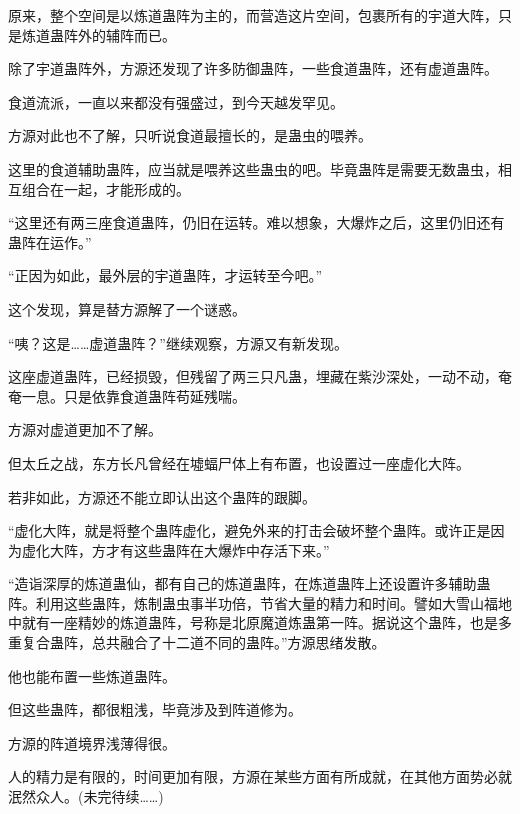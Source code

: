 \begin{this_body}
原来，整个空间是以炼道蛊阵为主的，而营造这片空间，包裹所有的宇道大阵，只是炼道蛊阵外的辅阵而已。

除了宇道蛊阵外，方源还发现了许多防御蛊阵，一些食道蛊阵，还有虚道蛊阵。

食道流派，一直以来都没有强盛过，到今天越发罕见。

方源对此也不了解，只听说食道最擅长的，是蛊虫的喂养。

这里的食道辅助蛊阵，应当就是喂养这些蛊虫的吧。毕竟蛊阵是需要无数蛊虫，相互组合在一起，才能形成的。

“这里还有两三座食道蛊阵，仍旧在运转。难以想象，大爆炸之后，这里仍旧还有蛊阵在运作。”

“正因为如此，最外层的宇道蛊阵，才运转至今吧。”

这个发现，算是替方源解了一个谜惑。

“咦？这是……虚道蛊阵？”继续观察，方源又有新发现。

这座虚道蛊阵，已经损毁，但残留了两三只凡蛊，埋藏在紫沙深处，一动不动，奄奄一息。只是依靠食道蛊阵苟延残喘。

方源对虚道更加不了解。

但太丘之战，东方长凡曾经在墟蝠尸体上有布置，也设置过一座虚化大阵。

若非如此，方源还不能立即认出这个蛊阵的跟脚。

“虚化大阵，就是将整个蛊阵虚化，避免外来的打击会破坏整个蛊阵。或许正是因为虚化大阵，方才有这些蛊阵在大爆炸中存活下来。”

“造诣深厚的炼道蛊仙，都有自己的炼道蛊阵，在炼道蛊阵上还设置许多辅助蛊阵。利用这些蛊阵，炼制蛊虫事半功倍，节省大量的精力和时间。譬如大雪山福地中就有一座精妙的炼道蛊阵，号称是北原魔道炼蛊第一阵。据说这个蛊阵，也是多重复合蛊阵，总共融合了十二道不同的蛊阵。”方源思绪发散。

他也能布置一些炼道蛊阵。

但这些蛊阵，都很粗浅，毕竟涉及到阵道修为。

方源的阵道境界浅薄得很。

人的精力是有限的，时间更加有限，方源在某些方面有所成就，在其他方面势必就泯然众人。(未完待续……)

\end{this_body}

